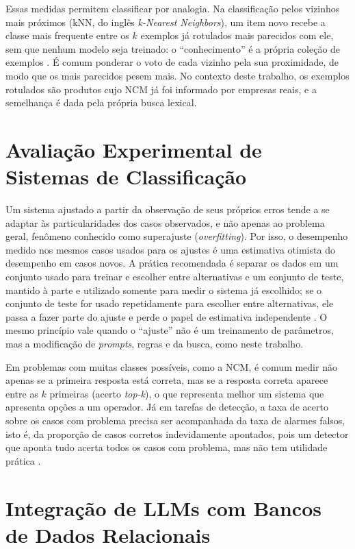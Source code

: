 Essas medidas permitem classificar por analogia. Na classificação pelos vizinhos mais próximos (kNN, do inglês \textit{k-Nearest Neighbors}), um item novo recebe a classe mais frequente entre os $k$ exemplos já rotulados mais parecidos com ele, sem que nenhum modelo seja treinado: o ``conhecimento'' é a própria coleção de exemplos \cite{cover1967knn}. É comum ponderar o voto de cada vizinho pela sua proximidade, de modo que os mais parecidos pesem mais. No contexto deste trabalho, os exemplos rotulados são produtos cujo NCM já foi informado por empresas reais, e a semelhança é dada pela própria busca lexical.

\section{Avaliação Experimental de Sistemas de Classificação}
\label{sec:avaliacao}

Um sistema ajustado a partir da observação de seus próprios erros tende a se adaptar às particularidades dos casos observados, e não apenas ao problema geral, fenômeno conhecido como superajuste (\textit{overfitting}). Por isso, o desempenho medido nos mesmos casos usados para os ajustes é uma estimativa otimista do desempenho em casos novos. A prática recomendada é separar os dados em um conjunto usado para treinar e escolher entre alternativas e um conjunto de teste, mantido à parte e utilizado somente para medir o sistema já escolhido; se o conjunto de teste for usado repetidamente para escolher entre alternativas, ele passa a fazer parte do ajuste e perde o papel de estimativa independente \cite{hastie2009elements}. O mesmo princípio vale quando o ``ajuste'' não é um treinamento de parâmetros, mas a modificação de \textit{prompts}, regras e da busca, como neste trabalho.

Em problemas com muitas classes possíveis, como a NCM, é comum medir não apenas se a primeira resposta está correta, mas se a resposta correta aparece entre as $k$ primeiras (acerto \textit{top-k}), o que representa melhor um sistema que apresenta opções a um operador. Já em tarefas de detecção, a taxa de acerto sobre os casos com problema precisa ser acompanhada da taxa de alarmes falsos, isto é, da proporção de casos corretos indevidamente apontados, pois um detector que aponta tudo acerta todos os casos com problema, mas não tem utilidade prática \cite{manning2008ir}.

\section{Integração de LLMs com Bancos de Dados Relacionais}


